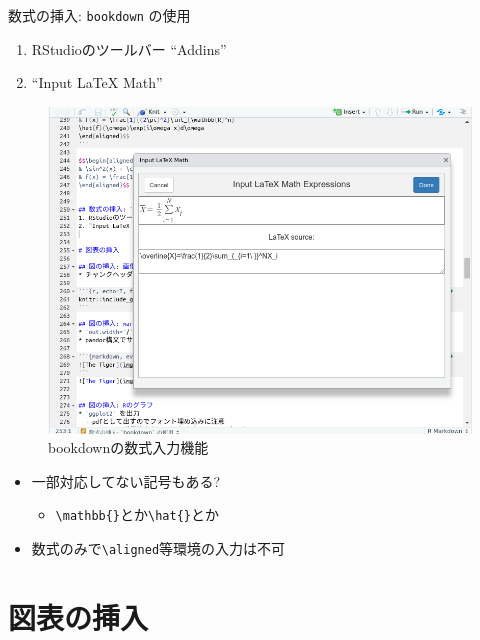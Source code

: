 \documentclass[
  12pt,
  ignorenonframetext,
]{beamer}
\providecommand{\tightlist}{%
  \setlength{\itemsep}{0pt}\setlength{\parskip}{0pt}}
\begin{document}
\begin{frame}[fragile]{数式の挿入: \texttt{bookdown} の使用}
\protect\hypertarget{ux6570ux5f0fux306eux633fux5165-bookdown-ux306eux4f7fux7528}{}

\begin{enumerate}
\tightlist
\item
  RStudioのツールバー ``Addins''
\item
  ``Input LaTeX Math''
\end{enumerate}

\begin{figure}

{\centering \includegraphics[width=0.5\linewidth,height=0.4\textheight]{img/math-input} 

}

\caption{bookdownの数式入力機能}\label{fig:math-input}
\end{figure}

\begin{itemize}
\tightlist
\item
  一部対応してない記号もある?

  \begin{itemize}
  \tightlist
  \item
    \texttt{\textbackslash{}mathbb\{\}}とか\texttt{\textbackslash{}hat\{\}}とか
  \end{itemize}
\item
  数式のみで\texttt{\textbackslash{}aligned}等環境の入力は不可
\end{itemize}

\end{frame}

\hypertarget{ux56f3ux8868ux306eux633fux5165}{%
\section{図表の挿入}\label{ux56f3ux8868ux306eux633fux5165}}
\end{document}
